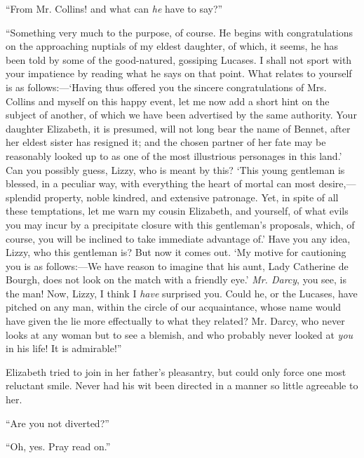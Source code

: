 \documentclass[12pt,openright]{book}
\begin{document}
“From Mr. Collins! and what can \textit{he} have to say?”

“Something very much to the purpose, of course. He begins with congratulations on the approaching nuptials of my eldest daughter, of which, it seems, he has been told by some of the good-natured, gossiping Lucases. I shall not sport with your impatience by reading what he says on that point. What relates to yourself is as follows:—‘Having thus offered you the sincere congratulations of Mrs. Collins and myself on this happy event, let me now add a short hint on the subject of another, of which we have been advertised by the same authority. Your daughter Elizabeth, it is presumed, will not long bear the name of Bennet, after her eldest sister has resigned it; and the chosen partner of her fate may be reasonably looked up to as one of the most illustrious personages in this land.’ Can you possibly guess, Lizzy, who is meant by this? ‘This young gentleman is blessed, in a peculiar way, with everything the heart of mortal can most desire,—splendid property, noble kindred, and extensive patronage. Yet, in spite of all these temptations, let me warn my cousin Elizabeth, and yourself, of what evils you may incur by a precipitate closure with this gentleman’s proposals, which, of course, you will be inclined to take immediate advantage of.’ Have you any idea, Lizzy, who this gentleman is? But now it comes out. ‘My motive for cautioning you is as follows:—We have reason to imagine that his aunt, Lady Catherine de Bourgh, does not look on the match with a friendly eye.’ \textit{Mr. Darcy}, you see, is the man! Now, Lizzy, I think I \textit{have} surprised you. Could he, or the Lucases, have pitched on any man, within the circle of our acquaintance, whose name would have given the lie more effectually to what they related? Mr. Darcy, who never looks at any woman but to see a blemish, and who probably never looked at \textit{you} in his life! It is admirable!”

Elizabeth tried to join in her father’s pleasantry, but could only force one most reluctant smile. Never had his wit been directed in a manner so little agreeable to her.

“Are you not diverted?”

“Oh, yes. Pray read on.”
\end{document}
